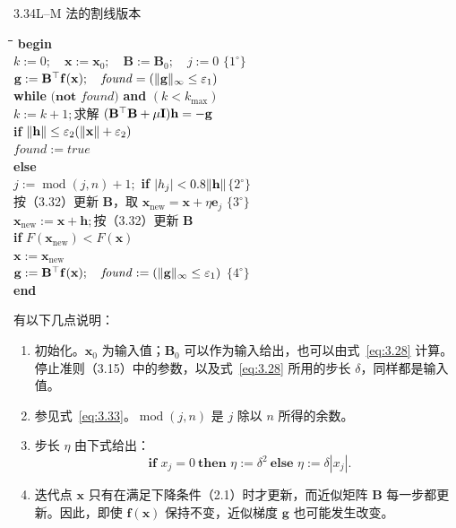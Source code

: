\begin{algorithmbox}{3.34}{L--M 法的割线版本}\label{alg:3.34}
\small
\begin{tabbing}
  \qquad\=\qquad\=\qquad\=\qquad\=\kill
  \textbf{begin}\\
  \> $k:=0;\quad\mathbf x:=\mathbf x_0;\quad\mathbf B:=\mathbf B_0;\quad j:=0$
       \qquad $\{1^\circ\}$\\
  \> $\mathbf g:=\mathbf B^{\top}\mathbf f(\mathbf x);\quad
       \mathit{found}=(\lVert\mathbf g\rVert_{\infty}\leq\varepsilon_1)$\\
  \> \textbf{while} $\bigl(\textbf{not }\mathit{found}\bigr)$
       \textbf{and} $(k<k_{\max})$\\
  \>\> $k:=k+1;$\quad 求解 $(\mathbf B^{\top}\mathbf B+\mu\mathbf I)\mathbf h=-\mathbf g$\\
  \>\> \textbf{if} $\lVert\mathbf h\rVert\leq\varepsilon_2(\lVert\mathbf x\rVert+\varepsilon_2)$\\
  \>\>\> $\mathit{found}:=\mathit{true}$\\
  \>\> \textbf{else}\\
  \>\>\> $j:=\operatorname{mod}(j,n)+1;$\quad
       \textbf{if} $|h_j|<0.8\lVert\mathbf h\rVert$\quad $\{2^\circ\}$\\
  \>\>\>\> 按（3.32）更新 $\mathbf B$，取 $\mathbf x_{\mathrm{new}}=\mathbf x+\eta\mathbf e_j$
       \quad $\{3^\circ\}$\\
  \>\>\> $\mathbf x_{\mathrm{new}}:=\mathbf x+\mathbf h;$\quad 按（3.32）更新 $\mathbf B$\\
  \>\>\> \textbf{if} $F(\mathbf x_{\mathrm{new}})<F(\mathbf x)$\\
  \>\>\>\> $\mathbf x:=\mathbf x_{\mathrm{new}}$\\
  \>\> $\mathbf g:=\mathbf B^{\top}\mathbf f(\mathbf x);\quad
       \mathit{found}:=(\lVert\mathbf g\rVert_{\infty}\leq\varepsilon_1)$
       \quad $\{4^\circ\}$\\
  \textbf{end}
\end{tabbing}
\end{algorithmbox}

有以下几点说明：
\begin{enumerate}[label=$\arabic*^\circ$,leftmargin=2.4em]
  \item 初始化。$\mathbf x_0$ 为输入值；$\mathbf B_0$ 可以作为输入给出，也可以由式~\eqref{eq:3.28} 计算。停止准则（3.15）中的参数，以及式~\eqref{eq:3.28} 所用的步长 $\delta$，同样都是输入值。
  \item 参见式~\eqref{eq:3.33}。$\operatorname{mod}(j,n)$ 是 $j$ 除以 $n$ 所得的余数。
  \item 步长 $\eta$ 由下式给出：
    \[
      \textbf{if }x_j=0\ \textbf{then }\eta:=\delta^2
      \ \textbf{else }\eta:=\delta|x_j|.
    \]
  \item 迭代点 $\mathbf x$ 只有在满足下降条件（2.1）时才更新，而近似矩阵 $\mathbf B$ 每一步都更新。因此，即使 $\mathbf f(\mathbf x)$ 保持不变，近似梯度 $\mathbf g$ 也可能发生改变。
\end{enumerate}

